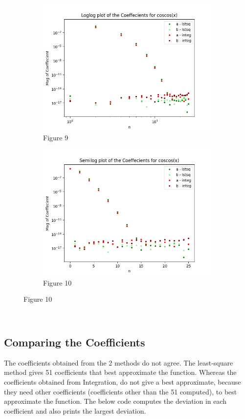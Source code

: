 \documentclass[12pt, a4paper]{report}
\begin{document}
\begin{figure}[h!]

\begin{subfigure}{0.55\textwidth}
    \centering
    \includegraphics[scale=0.9,width=\linewidth]{fig9.png} 
    \caption{Figure 9}
    \label{fig:my_label}
\end{subfigure}
\begin{subfigure}{0.55\textwidth}
    \centering
    \includegraphics[scale=0.9,width=\linewidth]{fig10.png} 
    \caption{Figure 10}
    \label{fig:image2}
\end{subfigure}
\end{figure}

\
\subsection{Comparing the Coefficients}
The coefficients obtained from the 2 methods do not agree. The least-square method gives 51 coefficients that best approximate the function. Whereas the coefficients obtained from Integration, do not give a best approximate, because they need other coefficients (coefficients other than the 51 computed), to best approximate the function. The below code computes the deviation in each coefficient and also prints the largest deviation. 
\vspace{10mm}

\end{document}
